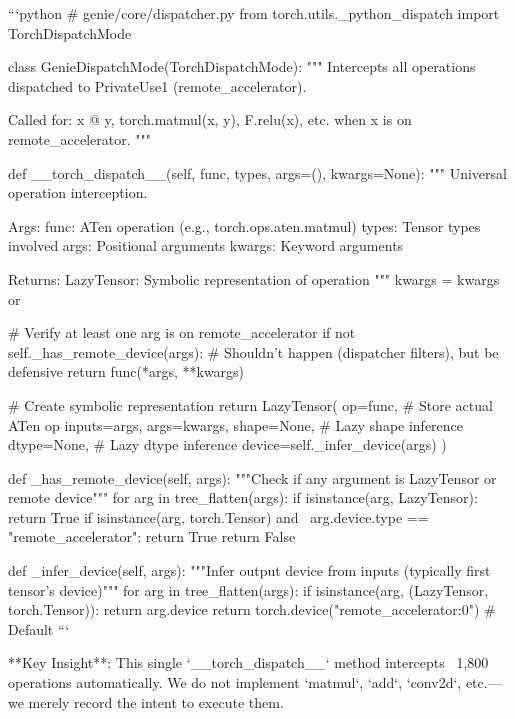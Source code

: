 ```python
# genie/core/dispatcher.py
from torch.utils._python_dispatch import TorchDispatchMode

class GenieDispatchMode(TorchDispatchMode):
    """
    Intercepts all operations dispatched to PrivateUse1 (remote_accelerator).
    
    Called for: x @ y, torch.matmul(x, y), F.relu(x), etc.
    when x is on remote_accelerator.
    """
    
    def __torch_dispatch__(self, func, types, args=(), kwargs=None):
        """
        Universal operation interception.
        
        Args:
            func: ATen operation (e.g., torch.ops.aten.matmul)
            types: Tensor types involved
            args: Positional arguments
            kwargs: Keyword arguments
        
        Returns:
            LazyTensor: Symbolic representation of operation
        """
        kwargs = kwargs or {}
        
        # Verify at least one arg is on remote_accelerator
        if not self._has_remote_device(args):
            # Shouldn't happen (dispatcher filters), but be defensive
            return func(*args, **kwargs)
        
        # Create symbolic representation
        return LazyTensor(
            op=func,  # Store actual ATen op
            inputs=args,
            args=kwargs,
            shape=None,  # Lazy shape inference
            dtype=None,  # Lazy dtype inference
            device=self._infer_device(args)
        )
    
    def _has_remote_device(self, args):
        """Check if any argument is LazyTensor or remote device"""
        for arg in tree_flatten(args):
            if isinstance(arg, LazyTensor):
                return True
            if isinstance(arg, torch.Tensor) and \
               arg.device.type == "remote_accelerator":
                return True
        return False
    
    def _infer_device(self, args):
        """Infer output device from inputs (typically first tensor's device)"""
        for arg in tree_flatten(args):
            if isinstance(arg, (LazyTensor, torch.Tensor)):
                return arg.device
        return torch.device("remote_accelerator:0")  # Default
```

**Key Insight**: This single `__torch_dispatch__` method intercepts ~1,800 operations automatically. We do not implement `matmul`, `add`, `conv2d`, etc.—we merely record the intent to execute them.

